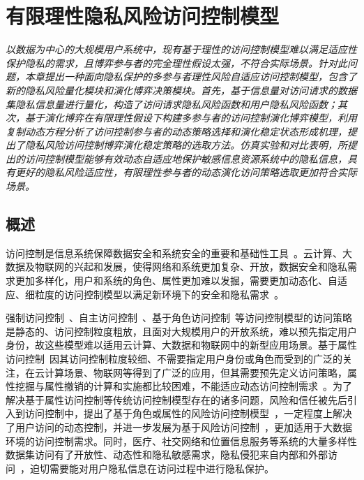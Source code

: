 \chapter{有限理性隐私风险访问控制模型}
\label{chap:evolutionary-rabac}

\textit{ }

\textit{以数据为中心的大规模用户系统中，现有基于理性的访问控制模型难以满足适应性保护隐私的需求，且博弈参与者的完全理性假设太强，不符合实际场景。针对此问题，本章提出一种面向隐私保护的多参与者理性风险自适应访问控制模型，包含了新的隐私风险量化模块和演化博弈决策模块。首先，基于信息量对访问请求的数据集隐私信息量进行量化，构造了访问请求隐私风险函数和用户隐私风险函数；其次，基于演化博弈在有限理性假设下构建多参与者的访问控制演化博弈模型，利用复制动态方程分析了访问控制参与者的动态策略选择和演化稳定状态形成机理，提出了隐私风险访问控制博弈演化稳定策略的选取方法。仿真实验和对比表明，所提出的访问控制模型能够有效动态自适应地保护敏感信息资源系统中的隐私信息，具有更好的隐私风险适应性，有限理性参与者的动态演化访问策略选取更加符合实际场景。}

\section{概述}
访问控制是信息系统保障数据安全和系统安全的重要和基础性工具~\cite{sandhu1994access}。云计算、大数据及物联网的兴起和发展，使得网络和系统更加复杂、开放，数据安全和隐私需求更加多样化，用户和系统的角色、属性更加难以发掘，需要更加动态化、自适应、细粒度的访问控制模型以满足新环境下的安全和隐私需求~\cite{li2017access}。

强制访问控制~\cite{mccune2006shamon}、自主访问控制~\cite{downs1985issues}、基于角色访问控制~\cite{sandhu1996role}等访问控制模型的访问策略是静态的、访问控制粒度粗放，且面对大规模用户的开放系统，难以预先指定用户身份，故这些模型难以适用云计算、大数据和物联网中的新型应用场景。基于属性访问控制~\cite{wang2010hierarchical}因其访问控制粒度较细、不需要指定用户身份或角色而受到的广泛的关注，在云计算场景、物联网等得到了广泛的应用，但其需要预先定义访问策略，属性挖掘与属性撤销的计算和实施都比较困难，不能适应动态访问控制需求~\cite{servos2017current}。为了解决基于属性访问控制等传统访问控制模型存在的诸多问题，风险和信任被先后引入到访问控制中，提出了基于角色或属性的风险访问控制模型~\cite{dimmock2004using,kandala2011attribute,krautsevich2014towards}，一定程度上解决了用户访问的动态控制，并进一步发展为基于风险访问控制~\cite{cheng2007fuzzy,ni2010risk}，更加适用于大数据环境的访问控制需求。同时，医疗、社交网络和位置信息服务等系统的大量多样性数据集访问有了开放性、动态性和隐私敏感需求，隐私侵犯来自内部和外部访问~\cite{boulares2017insider}，迫切需要能对用户隐私信息在访问过程中进行隐私保护。

